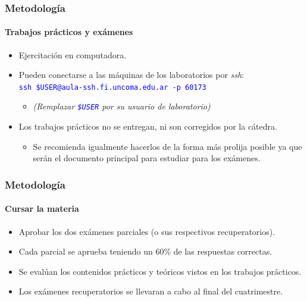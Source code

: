 \documentclass[11pt,a4paper,spanish]{beamer}
\newcommand{\codeword}[1]{\mbox{\texttt{\textcolor{blue}{#1}}}}
\begin{document}
\begin{frame}

    \frametitle{Metodología}
    \framesubtitle{Trabajos prácticos y exámenes}

\begin{itemize}

    \item Ejercitación en computadora.
    \item Pueden conectarse a las máquinas de los laboratorios por
        \emph{ssh}:\\
        \codeword{ssh \$USER@aula-ssh.fi.uncoma.edu.ar -p 60173}
        \begin{itemize}
            \item[] \tiny{\emph{(Remplazar \codeword{\$USER} por su usuario de
                laboratorio)}}
        \end{itemize}
    \item Los trabajos prácticos no se entregan, ni son corregidos por la
        cátedra.
        \begin{itemize}
            \item Se recomienda igualmente hacerlos de la forma más prolija
                posible ya que serán el documento principal para estudiar para
                los exámenes.
        \end{itemize}

\end{itemize}

\end{frame}

\begin{frame}

    \frametitle{Metodología}
    \framesubtitle{Cursar la materia}

\begin{itemize}

    \item Aprobar los dos exámenes parciales (o sus respectivos
        recuperatorios).
    \item Cada parcial se aprueba teniendo un $60\%$ de las respuestas
        correctas.
    \item Se evalúan los contenidos prácticos y teóricos vistos en los
        trabajos prácticos.
    \item Los exámenes recuperatorios se llevaran a cabo al final del
        cuatrimestre.

\end{itemize}

\end{frame}
\end{document}
